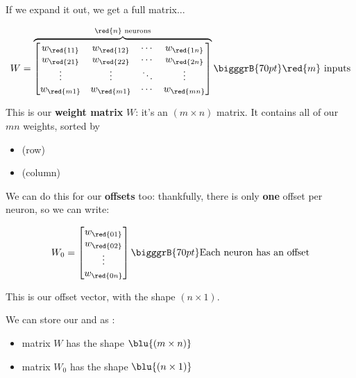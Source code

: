         If we expand it out, we get a full matrix...
        
        \begin{equation}
            W = 
            \overbrace{
                \begin{bmatrix}
                  w_{\red{11}} & w_{\red{12}} & \cdots & w_{\red{1n}} \\
                  w_{\red{21}} & w_{\red{22}} & \cdots & w_{\red{2n}} \\
                  \vdots       & \vdots       & \ddots & \vdots \\
                  w_{\red{m1}} & w_{\red{m1}} & \cdots & w_{\red{mn}} \\
                \end{bmatrix}
            }^{\red{n} \text{ neurons}}
            \bigggrB{70pt} \red{m} \text{ inputs}
        \end{equation}
        
        This is our \textbf{weight matrix} $W$: it's an $(m \times n)$ matrix. It contains all of our $mn$ weights, sorted by
        
        \begin{itemize}
            \item {} (row)
            \item {} (column)
        \end{itemize} 
        
        We can do this for our \textbf{offsets} too: thankfully, there is only \textbf{one} offset per neuron, so we can write:
        
        \begin{equation}
            W_0 = 
                \begin{bmatrix}
                  w_{\red{01}} \\ w_{\red{02}} \\ \vdots \\ w_{\red{0n}}
                \end{bmatrix}
            \bigggrB{70pt} \text{Each neuron has an offset}
        \end{equation}
        
        This is our offset vector, with the shape $(n \times 1)$.\\
        
        \begin{notation}
            We can store our  and  as :
            
            \begin{itemize}
                \item {} matrix $W$ has the shape $\blu{(m \times n)}$
                
                \item {} matrix $W_0$ has the shape $\blu{(n \times 1)}$
            \end{itemize}
        \end{notation}
        
